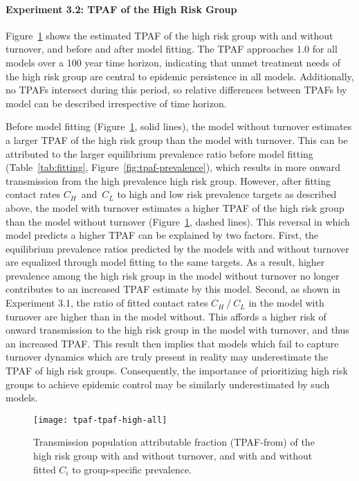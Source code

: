 \paragraph{Experiment 3.2: TPAF of the High Risk Group}
Figure~\ref{fig:tpaf} shows the estimated TPAF of the high risk group
with and without turnover, and before and after model fitting.
The TPAF approaches 1.0 for all models over a 100 year time horizon,
indicating that unmet treatment needs of the high risk group
are central to epidemic persistence in all models.
Additionally, no TPAFs intersect during this period,
so relative differences between TPAFs by model can be described irrespective of time horizon.
\par
Before model fitting (Figure~\ref{fig:tpaf}, solid lines),
the model without turnover estimates a larger TPAF of the high risk group
than the model with turnover.
This can be attributed to the larger equilibrium prevalence ratio before model fitting
(Table~\ref{tab:fitting}, Figure~\ref{fig:tpaf-prevalence}),
which results in more onward transmission from the high prevalence high risk group.
However, after fitting contact rates $C_H$~and~$C_L$ to
high and low risk prevalence targets as described above,
the model with turnover estimates a higher TPAF of the high risk group
than the model without turnover
(Figure~\ref{fig:tpaf}, dashed lines).
This reversal in which model predicts a higher TPAF can be explained by two factors.
First, the equilibrium prevalence ratios predicted by the models with and without turnover
are equalized through model fitting to the same targets.
As a result, higher prevalence among the high risk group in the model without turnover
no longer contributes to an increased TPAF estimate by this model.
Second, as shown in Experiment 3.1, 
the ratio of fitted contact rates $C_H~/~C_L$ in the model with turnover
are higher than in the model without.
This affords a higher risk of onward transmission to the high risk group
in the model with turnover, and thus an increased TPAF.
This result then implies that
models which fail to capture turnover dynamics which are truly present in reality
may underestimate the TPAF of high risk groups.
Consequently, the importance of prioritizing high risk groups
to achieve epidemic control may be similarly underestimated by such models.
\begin{figure}
  \centering
  \texttt{[image: tpaf-tpaf-high-all]}
  \caption{Transmission population attributable fraction (TPAF-from)
    of the high risk group with and without turnover,
    and with and without fitted $C_i$ to group-specific prevalence.}
  \label{fig:tpaf}
\end{figure}